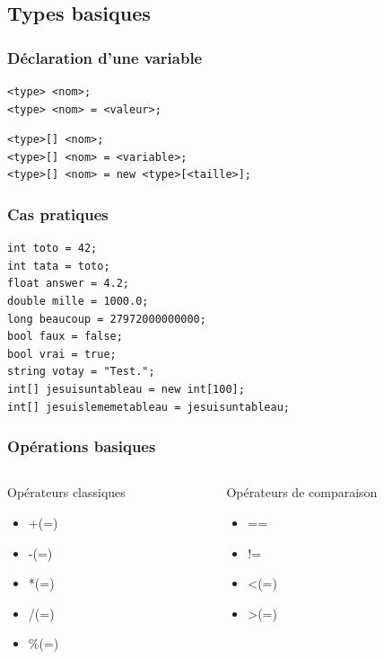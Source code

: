 \documentclass{beamer}
\begin{document}
\subsection{Types basiques}

\begin{frame}[fragile]
\frametitle{Déclaration d'une variable}
\begin{center}
\begin{lstlisting}
<type> <nom>;
<type> <nom> = <valeur>;
\end{lstlisting}
\pause
\begin{lstlisting}
<type>[] <nom>;
<type>[] <nom> = <variable>;
<type>[] <nom> = new <type>[<taille>];
\end{lstlisting}
\end{center}
\end{frame}

\begin{frame}[fragile]
\frametitle{Cas pratiques}
\begin{center}
\begin{lstlisting}
int toto = 42;
int tata = toto;
float answer = 4.2;
double mille = 1000.0;
long beaucoup = 27972000000000;
bool faux = false;
bool vrai = true;
string votay = "Test.";
int[] jesuisuntableau = new int[100];
int[] jesuislememetableau = jesuisuntableau;
\end{lstlisting}
\end{center}
\end{frame}

\begin{frame}[fragile]
\frametitle{Opérations basiques}
\begin{columns}[T]

\begin{column}{.48\textwidth}
Opérateurs classiques
\begin{itemize}
\item +(=)
\item -(=)
\item *(=)
\item /(=)
\item \%(=)
\end{itemize}
\end{column}

\hfill

\begin{column}{.48\textwidth}
Opérateurs de comparaison
\begin{itemize}
\item ==
\item !=
\item \textless (=)
\item \textgreater (=)
\end{itemize}
\end{column}

\end{columns}
\end{frame}
\end{document}
